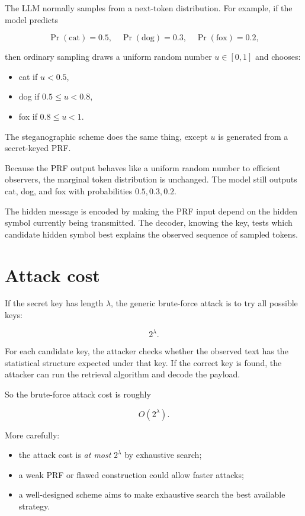 \documentclass[11pt]{article}
\begin{document}
\begin{example}
\label{ex:prf-sampling}
The LLM normally samples from a next-token distribution. For example, if the model predicts

\[
\Pr(\text{cat})=0.5,\quad
\Pr(\text{dog})=0.3,\quad
\Pr(\text{fox})=0.2,
\]

then ordinary sampling draws a uniform random number $u\in[0,1]$ and chooses:

\begin{itemize}
    \item cat if $u<0.5$,
    \item dog if $0.5\le u<0.8$,
    \item fox if $0.8\le u<1$.
\end{itemize}

The steganographic scheme does the same thing, except $u$ is generated from a secret-keyed PRF.
\end{example}

Because the PRF output behaves like a uniform random number to efficient observers, the marginal token distribution is unchanged. The model still outputs cat, dog, and fox with probabilities $0.5,0.3,0.2$.

The hidden message is encoded by making the PRF input depend on the hidden symbol currently being transmitted. The decoder, knowing the key, tests which candidate hidden symbol best explains the observed sequence of sampled tokens.

\section{Attack cost}

If the secret key has length $\lambda$, the generic brute-force attack is to try all possible keys:

\[
2^\lambda.
\]

For each candidate key, the attacker checks whether the observed text has the statistical structure expected under that key. If the correct key is found, the attacker can run the retrieval algorithm and decode the payload.

So the brute-force attack cost is roughly

\[
O(2^\lambda).
\]

More carefully:

\begin{itemize}
    \item the attack cost is \emph{at most} $2^\lambda$ by exhaustive search;
    \item a weak PRF or flawed construction could allow faster attacks;
    \item a well-designed scheme aims to make exhaustive search the best available strategy.
\end{itemize}
\end{document}
